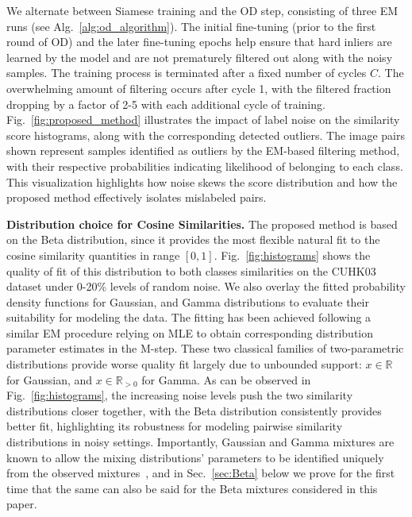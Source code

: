\documentclass[lettersize,journal]{IEEEtran}
\begin{document}
\vskip 0.1cm
We alternate between Siamese training and the OD step, consisting of three EM runs (see Alg.~\ref{alg:od_algorithm}).
The initial fine-tuning (prior to the first round of OD) and the later fine-tuning epochs help ensure that hard inliers are learned by the model and are not prematurely filtered out along with the noisy samples. The training process is terminated after a fixed number of cycles $C$. The overwhelming amount of filtering occurs after cycle 1, with the filtered fraction dropping by a factor of 2-5 with each additional cycle of training.
Fig.~\ref{fig:proposed_method} illustrates the impact of label noise on the similarity score histograms, along with the corresponding detected outliers. The image pairs shown represent samples identified as outliers by the EM-based filtering method, with their respective probabilities indicating likelihood of belonging to each class. This visualization highlights how noise skews the score distribution and how the proposed method effectively isolates mislabeled pairs.

\vskip 0.15cm
\noindent
\textbf{Distribution choice for Cosine Similarities.} The proposed method is based on the Beta distribution, since it provides the most flexible natural fit to the cosine similarity quantities in range $[0,1]$. Fig.~\ref{fig:histograms} shows the quality of fit of this distribution to both classes similarities on the CUHK03 dataset under 0-20\% levels of random noise. We also overlay the fitted probability density functions for Gaussian, and Gamma distributions to evaluate their suitability for modeling the data. The fitting has been achieved following a similar EM procedure relying on MLE to obtain corresponding distribution parameter estimates in the M-step. These two classical families of two-parametric distributions provide worse quality fit largely due to unbounded support: $x\in\mathbb{R}$ for Gaussian, and $x\in\mathbb{R}_{>0}$ for Gamma. As can be observed in Fig.~\ref{fig:histograms}, the increasing noise levels push the two similarity distributions closer together, with the Beta distribution consistently provides better fit, highlighting its robustness for modeling pairwise similarity distributions in noisy settings. Importantly, Gaussian and Gamma mixtures are known to allow the mixing distributions' parameters to be identified uniquely from the observed mixtures~\cite{atienza2006new}, and in Sec.~\ref{sec:Beta} below we prove for the first time that the same can also be said for the Beta mixtures considered in this paper.
\end{document}

